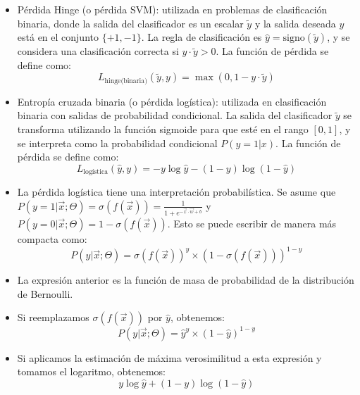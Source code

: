 \begin{itemize}
 \item Pérdida Hinge (o pérdida SVM): utilizada en problemas de clasificación binaria, donde la salida del clasificador es un escalar $\tilde{y}$ y la salida deseada $y$ está en el conjunto $\{+1,-1\}$. La regla de clasificación es $\hat{y} = \text{signo}(\tilde{y})$, y se considera una clasificación correcta si $y \cdot \tilde{y} > 0$. La función de pérdida se define como:
 \begin{displaymath}
  L_{\text{hinge(binaria)}}(\tilde{y},y) = \max(0,1-y \cdot \tilde{y})
 \end{displaymath}

 \item Entropía cruzada binaria (o pérdida logística): utilizada en clasificación binaria con salidas de probabilidad condicional. La salida del clasificador $\tilde{y}$ se transforma utilizando la función sigmoide para que esté en el rango $[0,1]$, y se interpreta como la probabilidad condicional $P(y=1|x)$. La función de pérdida se define como:
  \begin{displaymath}
  L_{\text{logística}}(\hat{y},y) = -y \log \hat{y} - (1-y) \log(1-\hat{y})
 \end{displaymath}

 \item La pérdida logística tiene una interpretación probabilística. Se asume que $P(y =1 | \vec{x} ; \Theta) = \sigma(f(\vec{x})) = \frac{1}{1+e^{-\vec{x}\cdot \vec{w}+b}}$ y $P(y = 0 | \vec{x} ; \Theta) = 1 - \sigma(f(\vec{x}))$. Esto se puede escribir de manera más compacta como:
 \begin{displaymath}
  P(y | \vec{x} ; \Theta) = \sigma(f(\vec{x}))^y\times(1-\sigma(f(\vec{x})))^{1-y}
 \end{displaymath}

 \item La expresión anterior es la función de masa de probabilidad de la distribución de Bernoulli.

 \item Si reemplazamos $\sigma(f(\vec{x}))$ por $\hat{y}$, obtenemos:
 \begin{displaymath}
  P(y | \vec{x} ; \Theta) = \hat{y}^y\times(1-\hat{y})^{1-y}
 \end{displaymath}
 \item Si aplicamos la estimación de máxima verosimilitud a esta expresión y tomamos el logaritmo, obtenemos:
 \begin{displaymath}
  y \log \hat{y} + (1-y) \log(1-\hat{y})
 \end{displaymath}


\end{itemize}
